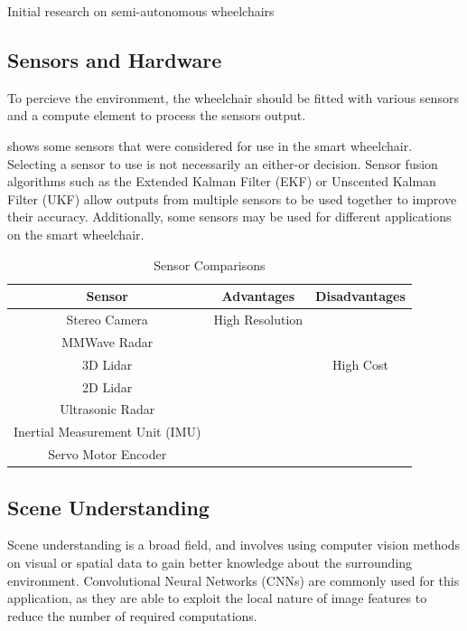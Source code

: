 \documentclass[12pt]{article}
\begin{document}
Initial research on semi-autonomous wheelchairs 

\subsection{Sensors and Hardware}
To percieve the environment, the wheelchair should be fitted with various sensors and
a compute element to process the sensors output. 

 shows some sensors that were considered for use in the smart wheelchair.
Selecting a sensor to use is not necessarily an either-or decision. Sensor fusion algorithms such as
the Extended Kalman Filter (EKF) or Unscented Kalman Filter (UKF) \cite{wanUnscentedKalmanFilter2000} allow
outputs from multiple sensors to be used together to improve their accuracy. Additionally, some sensors may
be used for different applications on the smart wheelchair.

\begin{table}
    \centering
    \begin{tabular}{c c c}
    \toprule
    Sensor & Advantages & Disadvantages \\
    \midrule
    Stereo Camera & High Resolution & \\
    MMWave Radar & & \\
    3D Lidar & & High Cost \\
    2D Lidar & & \\
    Ultrasonic Radar & & \\
    Inertial Measurement Unit (IMU) & & \\
    Servo Motor Encoder & & \\
    \bottomrule
    \end{tabular}
    \caption{Sensor Comparisons}
    \label{table:sensor_options}
\end{table}

\subsection{Scene Understanding}
Scene understanding is a broad field, and involves using computer vision methods
on visual or spatial data to gain better knowledge about the surrounding environment.
Convolutional Neural Networks (CNNs) are commonly used for this application, as they
are able to exploit the local nature of image features to reduce the number of required computations.
\end{document}
